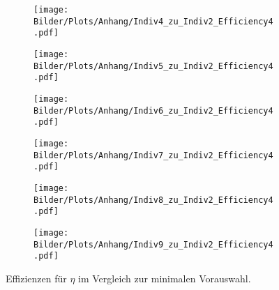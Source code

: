 \begin{figure}
  \begin{subfigure}[t]{0.5\textwidth}
  \texttt{[image: Bilder/Plots/Anhang/Indiv4\_zu\_Indiv2\_Efficiency4.pdf]}
  \end{subfigure}
\begin{subfigure}[t]{0.5\textwidth}
 \texttt{[image: Bilder/Plots/Anhang/Indiv5\_zu\_Indiv2\_Efficiency4.pdf]}
\end{subfigure}
\begin{subfigure}[t]{0.5\textwidth}
  \texttt{[image: Bilder/Plots/Anhang/Indiv6\_zu\_Indiv2\_Efficiency4.pdf]}
\end{subfigure}
\begin{subfigure}[t]{0.5\textwidth}
  \texttt{[image: Bilder/Plots/Anhang/Indiv7\_zu\_Indiv2\_Efficiency4.pdf]}
\end{subfigure}
\begin{subfigure}[t]{0.5\textwidth}
  \texttt{[image: Bilder/Plots/Anhang/Indiv8\_zu\_Indiv2\_Efficiency4.pdf]}
\end{subfigure}
\begin{subfigure}[t]{0.5\textwidth}
  \texttt{[image: Bilder/Plots/Anhang/Indiv9\_zu\_Indiv2\_Efficiency4.pdf]}
\end{subfigure}
\caption{Effizienzen für $\eta$ im Vergleich zur minimalen Vorauswahl.}
\end{figure}
\clearpage

